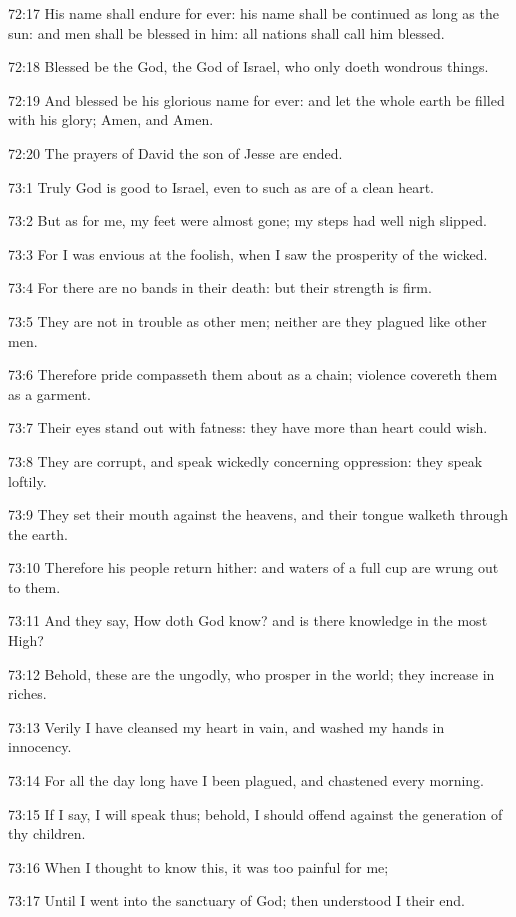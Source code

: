 72:17 His name shall endure for ever: his name shall be continued as long as the sun: and men shall be blessed in him: all nations shall call him blessed.

72:18 Blessed be the \LORD God, the God of Israel, who only doeth wondrous things.

72:19 And blessed be his glorious name for ever: and let the whole earth be filled with his glory; Amen, and Amen.

72:20 The prayers of David the son of Jesse are ended.



73:1 Truly God is good to Israel, even to such as are of a clean heart.

73:2 But as for me, my feet were almost gone; my steps had well nigh slipped.

73:3 For I was envious at the foolish, when I saw the prosperity of the wicked.

73:4 For there are no bands in their death: but their strength is firm.

73:5 They are not in trouble as other men; neither are they plagued like other men.

73:6 Therefore pride compasseth them about as a chain; violence covereth them as a garment.

73:7 Their eyes stand out with fatness: they have more than heart could wish.

73:8 They are corrupt, and speak wickedly concerning oppression: they speak loftily.

73:9 They set their mouth against the heavens, and their tongue walketh through the earth.

73:10 Therefore his people return hither: and waters of a full cup are wrung out to them.

73:11 And they say, How doth God know? and is there knowledge in the most High?

73:12 Behold, these are the ungodly, who prosper in the world; they increase in riches.

73:13 Verily I have cleansed my heart in vain, and washed my hands in innocency.

73:14 For all the day long have I been plagued, and chastened every morning.

73:15 If I say, I will speak thus; behold, I should offend against the generation of thy children.

73:16 When I thought to know this, it was too painful for me;

73:17 Until I went into the sanctuary of God; then understood I their end.

